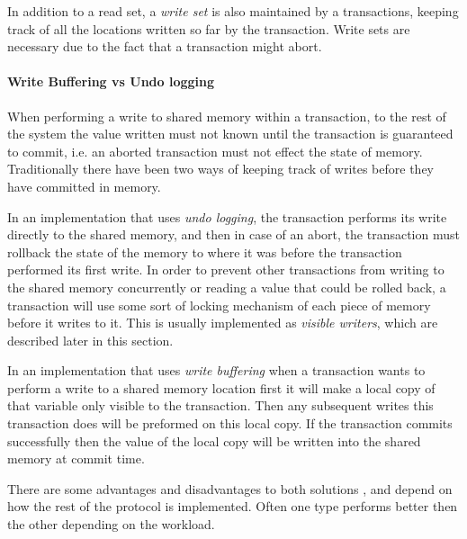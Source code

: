 In addition to a read set, a \emph{write set} is also maintained by a transactions, keeping track of all the locations
written so far by the transaction.
Write sets are necessary due to the fact that a transaction might abort.

\paragraph{Write Buffering vs Undo logging}
When performing a write to shared memory within a transaction, to the rest of  the system the value
 written must not known until the transaction is guaranteed to commit,
i.e. an aborted transaction must not effect the state of memory.
Traditionally there have been two ways of keeping track of writes before they have committed in memory.

In an implementation that uses \emph{undo logging},
the transaction performs its write
 directly to the shared memory, and then in case of an abort, the transaction must
 rollback the state of the memory to where it was before the transaction performed its first write.
In order to prevent other transactions from writing to the shared memory concurrently
 or reading a value that could be rolled back, a transaction will use some sort of locking mechanism of each piece of memory before it writes to it.
This is usually implemented as \emph{visible writers}, which are described later in this section.

In an implementation that uses \emph{write buffering}
when a transaction wants to perform
 a write to a shared memory location first it will make a local copy of that variable only visible to the transaction.
Then any subsequent writes this transaction does will be preformed on this local copy.
 If the transaction commits successfully then the value of the local copy will be written into the shared memory at commit time.

There are some advantages and disadvantages to both solutions \cite{1123001}, and depend on how the rest of the 
protocol is implemented.
Often one type performs better then the other depending on the workload.



